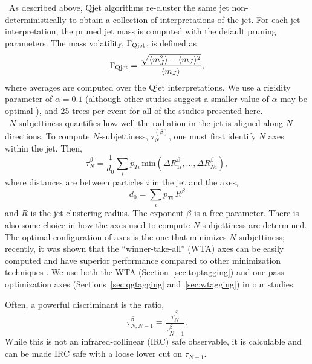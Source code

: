 ~As described above, Qjet algorithms re-cluster the same jet non-deterministically to obtain a collection of interpretations of the jet. For each jet interpretation, the pruned jet mass is computed with the default pruning parameters. The mass volatility, $\Gamma_{\rm Qjet}$, is defined as \cite{Ellis:2012sn}
%
\begin{equation}
\Gamma_{\rm Qjet} = \frac{\sqrt{\langle m_J^2 \rangle-\langle m_J\rangle^2}}{\langle m_J\rangle},
\end{equation}
%
where averages are computed over the Qjet interpretations. We use a rigidity parameter of $\alpha=0.1$ (although other studies suggest a smaller value of $\alpha$ may be optimal \cite{Ellis:2012sn,Ellis:2014eya}), and 25 trees per event for all of the studies presented here.\\

~$N$-subjettiness \cite{Thaler:2010tr} quantifies how well the radiation in the jet is aligned along $N$ directions. To compute $N$-subjettiness, $\tau_N^{(\beta)}$, one must first identify $N$ axes within the jet. Then,
%
\begin{equation}
\tau_N^{\beta} = \frac{1}{d_0} \sum_i p_{Ti} \,\mathrm{min}\left( \Delta R_{1i}^\beta,\ldots,\Delta R_{Ni}^\beta\right),
\end{equation}
%
where distances are between particles $i$ in the jet and the axes,
%
\begin{equation}
d_0 = \sum_i p_{Ti}\,R^\beta
\end{equation}
%
and $R$ is the jet clustering radius. The exponent $\beta$ is a free parameter. There is also some choice in how the axes used to compute $N$-subjettiness are determined. The optimal configuration of axes is the one that minimizes
$N$-subjettiness; recently, it was shown that the ``winner-take-all'' (WTA) axes can be easily computed and have superior performance compared to other minimization techniques \cite{Larkoski:2014uqa}. We use both the WTA (Section~\ref{sec:toptagging}) and one-pass \kT optimization axes (Sections~\ref{sec:qgtagging} and~\ref{sec:wtagging}) in our studies.

Often, a  powerful discriminant is  the ratio,
%
\begin{equation}
\tau_{N,N-1}^{\beta} \equiv \frac{\tau_N^{\beta}}{\tau_{N-1}^{\beta}}.
\end{equation}
%
While this is not an infrared-collinear (IRC) safe observable, it is calculable \cite{Larkoski:2013paa} and can be made IRC safe with a loose lower cut on $\tau_{N-1}$.\\


